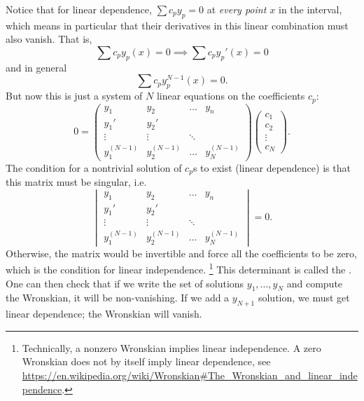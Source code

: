 Notice that for linear dependence, $\sum c_p y_p=0$ at \emph{every point $x$} in the interval, which means in particular that their derivatives in this linear combination must also vanish. That is,
\begin{equation}
    \sum c_p y_p(x) = 0\implies \sum c_p y_p'(x) = 0
\end{equation}
and in general
\begin{equation}
    \sum c_p y_p^{N-1}(x) =0.
\end{equation}
But now this is just a system of $N$ linear equations on the coefficients $c_p$:
\begin{equation}
    0 = \begin{pmatrix}
    y_1 & y_2 & \ldots & y_n\\
    y_1' & y_2' && \\
    \vdots &\vdots&\ddots& \\
    y_1^{(N-1)} & y_2^{(N-1)} &\ldots &y_N^{(N-1)}
    \end{pmatrix}
    \begin{pmatrix}
    c_1 \\ c_2 \\ \vdots \\ c_N
    \end{pmatrix}.
\end{equation}
The condition for a nontrivial solution of $c_p$s to exist (linear dependence) is that this matrix must be singular, i.e.
\begin{equation}
    \begin{vmatrix}
    y_1 & y_2 & \ldots & y_n\\
    y_1' & y_2' && \\
    \vdots &\vdots&\ddots& \\
    y_1^{(N-1)} & y_2^{(N-1)} &\ldots &y_N^{(N-1)}
    \end{vmatrix}=0.
\end{equation}
Otherwise, the matrix would be invertible and force all the coefficients to be zero, which is the condition for linear independence.%
    \footnote{Technically, a nonzero Wronskian implies linear independence. A zero Wronskian does not by itself imply linear dependence, see \url{https://en.wikipedia.org/wiki/Wronskian\#The_Wronskian_and_linear_independence}.}
This determinant is called the . One can then check that if we write the set of solutions $y_1,\ldots, y_N$ and compute the Wronskian, it will be non-vanishing. If we add a $y_{N+1}$ solution, we must get linear dependence; the Wronskian will vanish.

